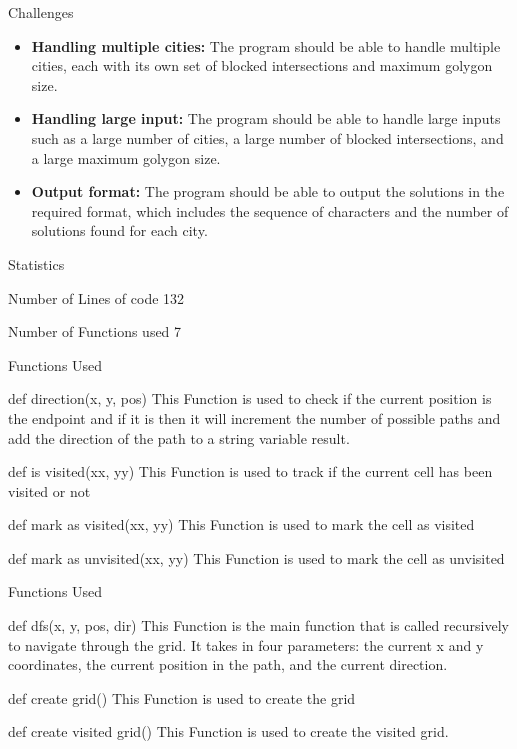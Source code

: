 \documentclass{beamer}
\begin{document}
\begin{frame}{Challenges}
\begin{itemize}
\item\textbf{Handling multiple cities:} The program should be able to handle multiple cities, each with its own set of blocked intersections and maximum golygon size.
\item\textbf{Handling large input:} The program should be able to handle large inputs such as a large number of cities, a large number of blocked intersections, and a large maximum golygon size.
\item\textbf{Output format:} The program should be able to output the solutions in the required format, which includes the sequence of characters and the number of solutions found for each city.
\end{itemize}
\end{frame}  
\begin{frame}{Statistics}
\begin{block}{Number of Lines of code}
  132  
\end{block}
\begin{block}{Number of Functions used}
7
\end{block}
\end{frame}
\begin{frame}{Functions Used}
\begin{block}{def direction(x, y, pos)}
This Function is used to check if the current position is the endpoint and if it is then it will increment the number of possible paths and add the direction of the path to a string variable result. 
\end{block}
\begin{block}{def is visited(xx, yy)}
This Function is used to track if the current cell has been visited or not
\end{block}
\begin{block}{def mark as visited(xx, yy)}
This Function is used to mark the cell as visited 
\end{block}
\begin{block}{def mark as unvisited(xx, yy)}
This Function is used to mark the cell as unvisited
\end{block}
\end{frame}
\begin{frame}{Functions Used}
\begin{block}{def dfs(x, y, pos, dir)}
This Function is the main function that is called recursively to navigate through the grid. It takes in four parameters: the current x and y coordinates, the current position in the path, and the current direction.
\end{block}
\begin{block}{def create grid()}
 This Function is used to create the grid 
\end{block}
\begin{block}{def create visited grid()}
This Function is used to create the visited grid.
\end{block}
\end{frame}
\end{document}
